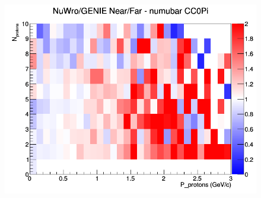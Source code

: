 \begin{figure}[h]
\endminipage
{}
\includegraphics[width=\linewidth]{N_P/nominal/protons/ratios/CC0Pi_NuWro_GENIE_numubar_NF_N_P.png}
\endminipage
\newline
\end{figure}
\clearpage
